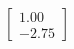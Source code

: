 \documentclass[preview]{standalone}
\begin{document}
\begin{align*}
\begin{bmatrix} 1.00 \\ -2.75 \end{bmatrix}
\end{align*}
\end{document}
